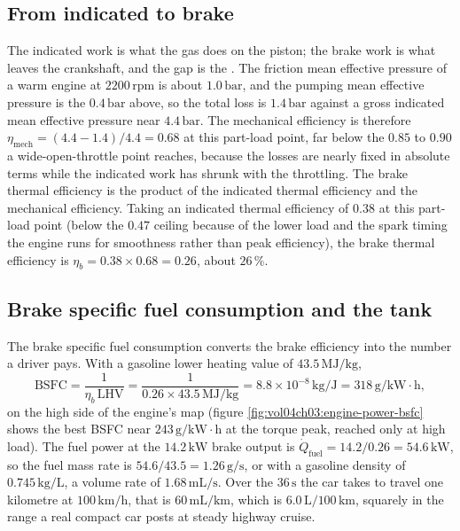 

\subsection{From indicated to brake}

The indicated work is what the gas does on the piston; the brake work is what
leaves the crankshaft, and the gap is the . The
friction mean effective pressure of a warm engine at $2200\,\text{rpm}$ is
about $1.0\,\text{bar}$, and the pumping mean effective pressure is the
$0.4\,\text{bar}$ above, so the total loss is $1.4\,\text{bar}$ against a gross
indicated mean effective pressure near $4.4\,\text{bar}$. The mechanical
efficiency is therefore $\eta_{\text{mech}} = (4.4 - 1.4)/4.4 = 0.68$ at this
part-load point, far below the $0.85$ to $0.90$ a wide-open-throttle point
reaches, because the losses are nearly fixed in absolute terms while the
indicated work has shrunk with the throttling. The brake thermal efficiency is
the product of the indicated thermal efficiency and the mechanical efficiency.
Taking an indicated thermal efficiency of $0.38$ at this part-load point (below
the $0.47$ ceiling because of the lower load and the spark timing the engine
runs for smoothness rather than peak efficiency), the brake thermal efficiency
is $\eta_b = 0.38 \times 0.68 = 0.26$, about $26\,\%$.

\subsection{Brake specific fuel consumption and the tank}

The brake specific fuel consumption converts the brake efficiency into the
number a driver pays. With a gasoline lower heating value of
$43.5\,\text{MJ}/\text{kg}$,
\[
\text{BSFC} = \frac{1}{\eta_b \, \text{LHV}} =
\frac{1}{0.26 \times 43.5\,\text{MJ}/\text{kg}} =
8.8 \times 10^{-8}\,\text{kg}/\text{J} = 318\,\text{g}/\text{kW}\cdot\text{h},
\]
on the high side of the engine's map (figure
\ref{fig:vol04ch03:engine-power-bsfc} shows the best BSFC near
$243\,\text{g}/\text{kW}\cdot\text{h}$ at the torque peak, reached only at high
load). The fuel power at the $14.2\,\text{kW}$ brake output is
$\dot Q_{\text{fuel}} = 14.2/0.26 = 54.6\,\text{kW}$, so the fuel mass rate is
$54.6/43.5 = 1.26\,\text{g}/\text{s}$, or with a gasoline density of
$0.745\,\text{kg}/\text{L}$, a volume rate of $1.68\,\text{mL}/\text{s}$. Over
the $36\,\text{s}$ the car takes to travel one kilometre at
$100\,\text{km}/\text{h}$, that is $60\,\text{mL}/\text{km}$, which is
$6.0\,\text{L}/100\,\text{km}$, squarely in the range a real compact car posts
at steady highway cruise.

